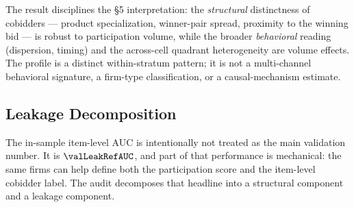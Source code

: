 The result disciplines the §5 interpretation: the
\emph{structural} distinctness of cobidders --- product
specialization, winner-pair spread, proximity to the winning bid ---
is robust to participation volume, while the broader
\emph{behavioral} reading (dispersion, timing) and the across-cell
quadrant heterogeneity are volume effects. The profile is a distinct
within-stratum pattern; it is not a multi-channel behavioral
signature, a firm-type classification, or a causal-mechanism estimate.

\subsection{Leakage Decomposition}
\label{app:leakage_submission}

The in-sample item-level AUC is intentionally not treated as the
main validation number. It is $\valLeakRefAUC$, and part of that
performance is mechanical: the same firms can help define both
the participation score and the item-level cobidder label. The
audit decomposes that headline into a structural component and a
leakage component.

